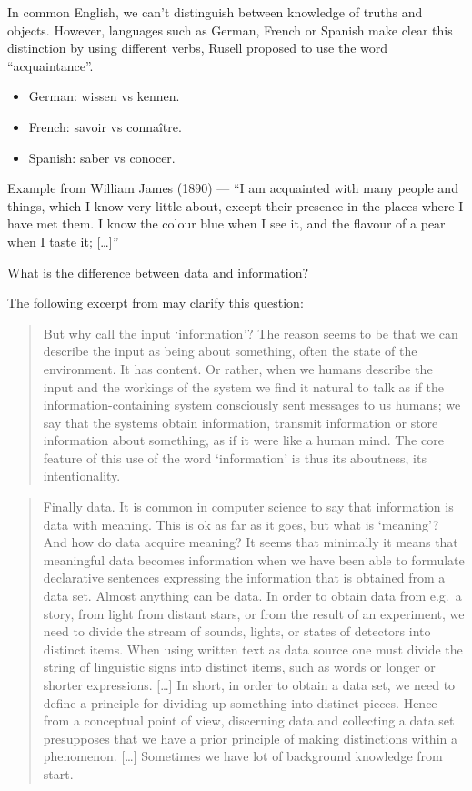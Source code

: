 \documentclass[
]{book}
\providecommand{\tightlist}{%
  \setlength{\itemsep}{0pt}\setlength{\parskip}{0pt}}
\begin{document}
In common English, we can't distinguish between knowledge of truths and objects. However, languages such as German, French or Spanish make clear this distinction by using different verbs, Rusell proposed to use the word ``acquaintance''.

\begin{itemize}
\tightlist
\item
  German: wissen vs kennen.
\item
  French: savoir vs connaître.
\item
  Spanish: saber vs conocer.
\end{itemize}

Example from William James (1890) --- ``I am acquainted with many people and things, which I know very little about, except their presence in the places where I have met them. I know the colour blue when I see it, and the flavour of a pear when I taste it; {[}\ldots{]}''

What is the difference between data and information?

The following excerpt from \citep{johansson2016philosophy} may clarify this question:

\begin{quote}
But why call the input `information'? The reason seems to be that we can describe the input as being about something, often the state of the environment. It has content. Or rather, when we humans describe the input and the workings of the system we find it natural to talk as if the information-containing system consciously sent messages to us humans; we say that the systems obtain information, transmit information or store information about something, as if it were like a human mind. The core feature of this use of the word `information' is thus its aboutness, its intentionality.
\end{quote}

\begin{quote}
Finally data. It is common in computer science to say that information is data with meaning. This is ok as far as it goes, but what is `meaning'? And how do data acquire meaning? It seems that minimally it means that meaningful data becomes information when we have been able to formulate declarative sentences expressing the information that is obtained from a data set. Almost anything can be data. In order to obtain data from e.g.~a story, from light from distant stars, or from the result of an experiment, we need to divide the stream of sounds, lights, or states of detectors into distinct items. When using written text as data source one must divide the string of linguistic signs into distinct items, such as words or longer or shorter expressions. {[}\ldots{]} In short, in order to obtain a data set, we need to define a principle for dividing up something into distinct pieces. Hence from a conceptual point of view, discerning data and collecting a data set presupposes that we have a prior principle of making distinctions within a phenomenon. {[}\ldots{]} Sometimes we have lot of background knowledge from start.
\end{quote}
\end{document}
